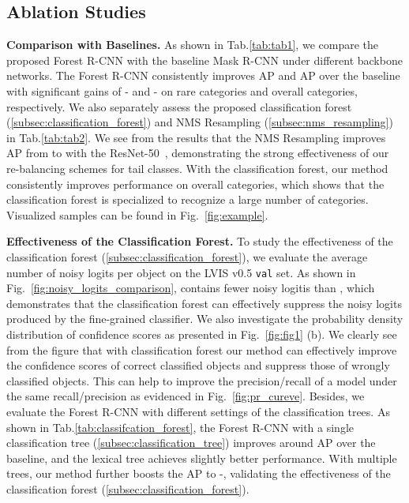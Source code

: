 \documentclass[sigconf]{acmart}
\newcommand{\myparagraph}[1]{{\vspace{0.5em} \noindent \bf #1}}
\begin{document}
\subsection{Ablation Studies}

\myparagraph{Comparison with Baselines.} As shown in Tab.\ref{tab:tab1}, we compare the proposed Forest R-CNN with the baseline Mask R-CNN under different backbone networks. The Forest R-CNN consistently improves AP and AP over the baseline with significant gains of - and - on rare categories and overall categories, respectively. We also separately assess the proposed classification forest (\cref{subsec:classification_forest}) and NMS Resampling (\cref{subsec:nms_resampling}) in Tab.\ref{tab:tab2}. We see from the results that the NMS Resampling improves AP from  to  with the ResNet-50~\cite{resnet}, demonstrating the strong effectiveness of our re-balancing schemes for tail classes. With the classification forest, our method consistently improves performance on overall categories, which shows that the classification forest is specialized to recognize a large number of categories. Visualized samples can be found in Fig.~\ref{fig:example}.

\myparagraph{Effectiveness of the Classification Forest.} To study the effectiveness of the classification forest (\cref{subsec:classification_forest}), we evaluate the average number of noisy logits per object on the LVIS v0.5 \texttt{val} set. As shown in Fig.~\ref{fig:noisy_logits_comparison},  contains fewer noisy logitis than , which demonstrates that the classification forest can effectively suppress the noisy logits produced by the fine-grained classifier. We also investigate the probability density distribution of confidence scores as presented in Fig.~\ref{fig:fig1} (b). We clearly see from the figure that with classification forest our method can effectively improve the confidence scores of correct classified objects and suppress those of wrongly classified objects. This can help to improve the precision/recall of a model under the same recall/precision as evidenced in Fig.~\ref{fig:pr_cureve}. Besides, we evaluate the Forest R-CNN with different settings of the classification trees. As shown in Tab.\ref{tab:classifcation_forest}, the Forest R-CNN with a single classification tree (\cref{subsec:classification_tree}) improves around  AP over the baseline, and the lexical tree achieves slightly better performance. With multiple trees, our method further boosts the AP to -, validating the effectiveness of the classification forest (\cref{subsec:classification_forest}). 
\end{document}
